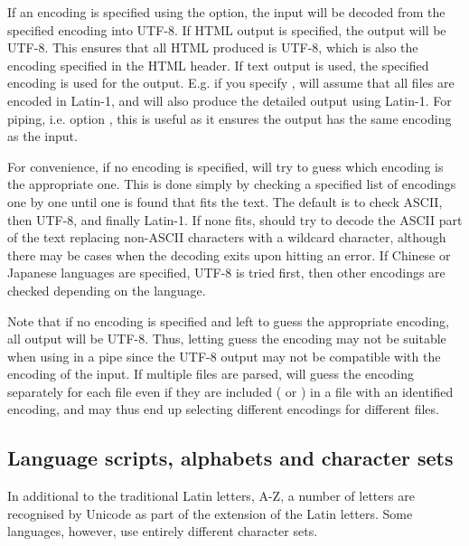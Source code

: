 \documentclass{article}
\begin{document}
If an encoding is specified using the  option, the input will be decoded from the specified encoding into UTF-8. If HTML output is specified, the output will be UTF-8. This ensures that all HTML produced is UTF-8, which is also the encoding specified in the HTML header. If text output is used, the specified encoding is used for the output. E.g. if you specify , \TeXcount{} will assume that all files are encoded in Latin-1, and will also produce the detailed output using Latin-1. For piping, i.e. option \code{-}, this is useful as it ensures the output has the same encoding as the input.

For convenience, if no encoding is specified, \TeXcount{} will try to guess which encoding is the appropriate one. This is done simply by checking a specified list of encodings one by one until one is found that fits the text. The default is to check ASCII, then UTF-8, and finally Latin-1. If none fits, \TeXcount{} should try to decode the ASCII part of the text replacing non-ASCII characters with a wildcard character, although there may be cases when the decoding exits upon hitting an error. If Chinese or Japanese languages are specified, UTF-8 is tried first, then other encodings are checked depending on the language.

Note that if no encoding is specified and \TeXcount{} left to guess the appropriate encoding, all output will be UTF-8. Thus, letting \TeXcount{} guess the encoding may not be suitable when using \TeXcount{} in a pipe since the UTF-8 output may not be compatible with the encoding of the input. If multiple files are parsed, \TeXcount{} will guess the encoding separately for each file even if they are included ( or ) in a file with an identified encoding, and may thus end up selecting different encodings for different files.


\subsection{Language scripts, alphabets and character sets}

In additional to the traditional Latin letters, A-Z, a number of letters are recognised by Unicode as part of the extension of the Latin letters. Some languages, however, use entirely different character sets.
\end{document}
